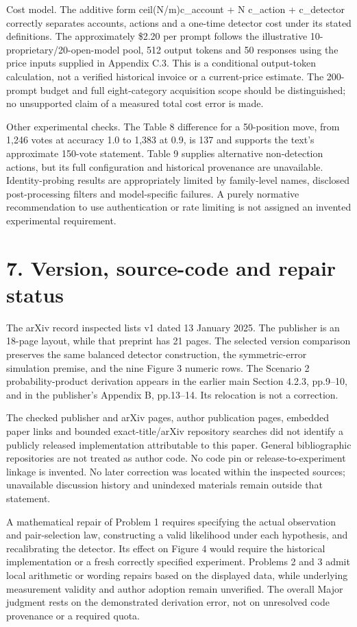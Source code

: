 \documentclass[10pt]{article}
\begin{document}
Cost model. The additive form ceil(N/m)c\_account + N c\_action + c\_detector correctly separates accounts, actions and a one-time detector cost under its stated definitions. The approximately \$2.20 per prompt follows the illustrative 10-proprietary/20-open-model pool, 512 output tokens and 50 responses using the price inputs supplied in Appendix C.3. This is a conditional output-token calculation, not a verified historical invoice or a current-price estimate. The 200-prompt budget and full eight-category acquisition scope should be distinguished; no unsupported claim of a measured total cost error is made.\par
Other experimental checks. The Table 8 difference for a 50-position move, from 1,246 votes at accuracy 1.0 to 1,383 at 0.9, is 137 and supports the text’s approximate 150-vote statement. Table 9 supplies alternative non-detection actions, but its full configuration and historical provenance are unavailable. Identity-probing results are appropriately limited by family-level names, disclosed post-processing filters and model-specific failures. A purely normative recommendation to use authentication or rate limiting is not assigned an invented experimental requirement.\par
\section*{7. Version, source-code and repair status}
The arXiv record inspected lists v1 dated 13 January 2025. The publisher is an 18-page layout, while that preprint has 21 pages. The selected version comparison preserves the same balanced detector construction, the symmetric-error simulation premise, and the nine Figure 3 numeric rows. The Scenario 2 probability-product derivation appears in the earlier main Section 4.2.3, pp.9–10, and in the publisher’s Appendix B, pp.13–14. Its relocation is not a correction.\par
The checked publisher and arXiv pages, author publication pages, embedded paper links and bounded exact-title/arXiv repository searches did not identify a publicly released implementation attributable to this paper. General bibliographic repositories are not treated as author code. No code pin or release-to-experiment linkage is invented. No later correction was located within the inspected sources; unavailable discussion history and unindexed materials remain outside that statement.\par
A mathematical repair of Problem 1 requires specifying the actual observation and pair-selection law, constructing a valid likelihood under each hypothesis, and recalibrating the detector. Its effect on Figure 4 would require the historical implementation or a fresh correctly specified experiment. Problems 2 and 3 admit local arithmetic or wording repairs based on the displayed data, while underlying measurement validity and author adoption remain unverified. The overall Major judgment rests on the demonstrated derivation error, not on unresolved code provenance or a required quota.\par
\end{document}

